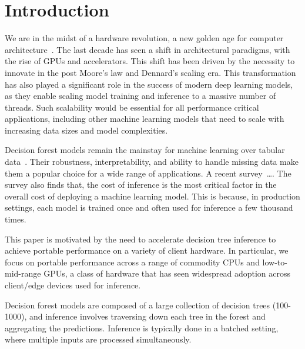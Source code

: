 \section{Introduction}
\label{sec:intro}
We are in the midst of a hardware revolution, a new golden age for computer architecture~\cite{TuringLecture}. The last decade has seen a shift in architectural paradigms, with the rise of GPUs and accelerators. This shift has been driven by the necessity to innovate in the post Moore's law and Dennard's scaling era. This transformation has also played a significant role in the success of modern deep learning models, as they enable scaling model training and inference to a massive number of threads. Such scalability would be essential for all performance critical applications, including other machine learning models that need to scale with increasing data sizes and model complexities. 

Decision forest models remain the mainstay for machine learning over tabular data~\cite{tabular}. 
Their robustness, interpretability, and ability to handle missing data make them a popular choice for a wide range of applications. 
A recent survey~\cite{kaggle}\dots. 
The survey also finds that, the cost of inference is the most critical factor in the overall cost of deploying a machine learning model.
This is because, in production settings, each model is trained once and often used for inference a few thousand times. 
%

This paper is motivated by the need to accelerate decision tree inference to achieve portable performance on a variety of client hardware.
In particular, we focus on portable performance across a range of commodity CPUs and low-to-mid-range GPUs, a class of hardware that has seen widespread adoption across client/edge devices used for inference.

Decision forest models are composed of a large collection of decision trees (100-1000), and inference involves traversing down each tree in the forest and aggregating the predictions. Inference is typically done in a batched setting, where multiple inputs are processed simultaneously.

